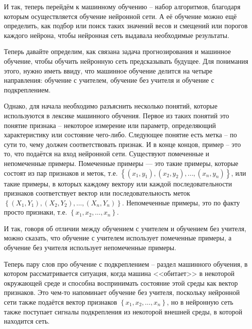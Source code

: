 {  \par \redline И так, теперь перейдём к машинному обучению – набор алгоритмов, благодаря которым осуществляется обучение нейронной сети. А её обучение можно ещё определить, как подбор или поиск таких значений весов и смещений или порогов каждого нейрона, чтобы нейронная сеть выдавала необходимые результаты.

  \par \redline Теперь давайте определим, как связана задача прогнозирования и машинное обучение, чтобы обучить нейронную сеть предсказывать будущее. Для понимания этого, нужно иметь ввиду, что машинное обучение делится на четыре направления: обучение с учителем, обучение без учителя и обучение с подкреплением.

  \par \redline Однако, для начала необходимо разъяснить несколько понятий, которые используются в лексике машинного обучения. Первое из таких понятий это понятие признака {--} некоторое измерение или параметр, определяющий характеристику или состояние чего-либо. Следующее понятие есть метка {--} по сути то, чему должен соответствовать признак.  И в конце концов, пример {--} это то, что подаётся на вход нейронной сети. Существуют помеченные и непомеченные примеры. Помеченные примеры — это такие примеры, которые состоят из пар признаков и меток, т.е. $\left\{\left(x_{1}, y_{1}\right), \left(x_{2}, y_{2}\right), \dots, \left(x_{n}, y_{n}\right)\right\}$, или такие примеры, в которых каждому вектору или каждой последовательности признаков соответствует вектор или последовательность меток $\left\{\left(X_{1}, Y_{1}\right), \left(X_{2}, Y_{2}\right), \dots, \left(X_{n}, Y_{n}\right)\right\}$. Непомеченные примеры, это по факту просто признаки, т.е. $\left\{x_{1}, x_{2}, \dots, x_{n}\right\}$.

  \par \redline И так, говоря об отличии между обучением с учителем и обучением без учителя, можно сказать, что обучение с учителем использует помеченные примеры, а обучение без учителя использует непомеченные примеры.

  \par \redline Теперь пару слов про обучение с подкреплением {--} раздел машинного обучения, в котором рассматривается ситуация, когда машина <<обитает>> в некоторой окружающей среде и способна воспринимать состояние этой среды как вектор признаков. Это чем-то напоминает обучение без учителя, поскольку нейронной сети также подаётся вектор признаков $\left\{x_{1}, x_{2}, \dots, x_{n}\right\}$, но в нейронную сеть также поступает сигналы подкрепления из некоторой внешней среды, в которой находится сеть.

}
